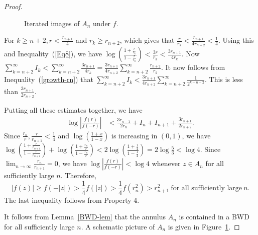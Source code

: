 \documentclass[11pt,a4paper]{article}
\begin{document}
\begin{proof}
\begin{figure}
\begin{center}
		\caption{{\label{bov}
				Iterated images of $A_n$ under $f$. }}
	\end{center}
\end{figure}
\par For $k\geq n+2, r< \frac{r_{n+1}}{4}$ and $r_k \geq r_{n+2}$, which gives that $\frac{r}{r_k} < \frac{r_{n+1}}{4 r_{n+2}}<\frac{1}{4}$. Using this and  Inequality~(\ref{Eq8}), we have
$ \log \left( \frac{1+\frac{r}{r_k}}{ 1-\frac{r}{r_k}}\right)  <   \frac{3r}{r_k} < \frac{3 r_{n+1}}{4r_{k}}$. Now
  $\sum_{k=n+2}^{\infty}I_k<\sum_{k=n+2}^{\infty} \frac{3r_{n+1}}{4r_k}=\frac{3r_{n+1}}{4r_{n+2}}\sum_{k=n+2}^{\infty} \frac{r_{n+2}}{r_k}$. It now follows from Inequality~(\ref{growth-rn}) that    $\sum_{k=n+2}^{\infty}I_k < \frac{3r_{n+1}}{4r_{n+2}} \sum_{k=n+2}^{\infty} \frac{1}{2^{k-n-2}}$. This is less than 
  	 $\frac{3r_{n+1}}{2r_{n+2}} $.
 
\par Putting all these estimates together, we have  
	\begin{align*}
		\log\left|\frac{f(r)}{f(-r)}\right|&< \frac{3r_{n-1}}{2r_n} +I_n +I_{n+1}+ \frac{3r_{n+1}}{2r_{n+2}}.
\end{align*}
Since $\frac{r_n}{r}, \frac{r}{r_{n+1}} < \frac{1}{4}$ and $\log \left(\frac{1+x}{1-x}\right)$ is increasing in $(0,1)$, we have	
$\log\left(\frac{{1+\frac{r}{r_{n+1}}}}{{1-\frac{r}{r_{n+1}}}}\right)+  	\log\left(\frac{{1+\frac{r_n}{r}}}{{1-\frac{r_n}{r}}}\right) <   2 \log\left(\frac{1+\frac{1}{4}}{{1-\frac{1}{4}}} \right)=2 \log \frac{5}{3}< \log 4$. 
	Since $\lim_{n\to\infty}\frac{r_{n}}{r_{n+1}} =0$, we have $\log \left| \frac{f(r)}{f(-r)}\right|<  \log4$ whenever $z \in A_n $ for all sufficiently large $n$.
Therefore, $$|f(z)|\geq f(-|z|)>\frac{1}{4}f(|z|)>\frac{1}{4}f({r_n^2})>{r^{2}_{n+1}} ~\mbox{for all sufficiently large}~ n.$$  The last inequality follows from Property 4.  
\par
It follows from Lemma~\ref{BWD-lem} that the annulus $A_n $ is contained in a BWD for all sufficiently large $n$. A schematic picture of $A_n$ is given in Figure~\ref{bov}.
\end{proof}
\end{document}
